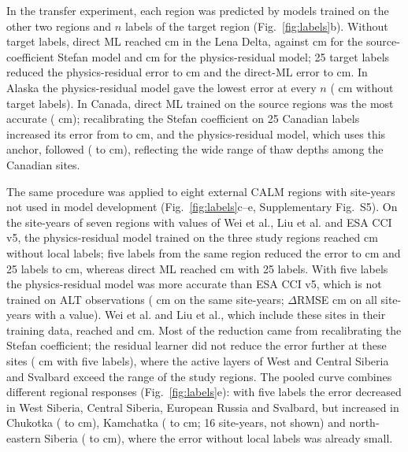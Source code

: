In the transfer experiment, each region was predicted by models trained on the other two regions and $n$ labels of the target region (Fig.~\ref{fig:labels}b). Without target labels, direct ML reached \ntlrmseLeDszero{} cm in the Lena Delta, against \ntlrmseLePzzero{} cm for the source-coefficient Stefan model and \ntlrmseLeRszero{} cm for the physics-residual model; 25 target labels reduced the physics-residual error to \ntlrmseLeRstwfive{} cm and the direct-ML error to \ntlrmseLeDstwfive{} cm. In Alaska the physics-residual model gave the lowest error at every $n$ (\ntlrmseAkRszero{} cm without target labels). In Canada, direct ML trained on the source regions was the most accurate (\ntlrmseCaDszero{} cm); recalibrating the Stefan coefficient on 25 Canadian labels increased its error from \ntlrmseCaPzzero{} to \ntlrmseCaPntwfive{} cm, and the physics-residual model, which uses this anchor, followed (\ntlrmseCaRszero{} to \ntlrmseCaRstwfive{} cm), reflecting the wide range of thaw depths among the Canadian sites.

The same procedure was applied to eight external CALM regions with \nftScoredRows{} site-years not used in model development (Fig.~\ref{fig:labels}c--e, Supplementary Fig.~S5). On the \nftrows{} site-years of seven regions with values of Wei et al., Liu et al. and ESA CCI v5, the physics-residual model trained on the three study regions reached \nftAllRszero{} cm without local labels; five labels from the same region reduced the error to \nftAllRsfive{} cm and 25 labels to \nftAllRstwfive{} cm, whereas direct ML reached \nftAllDstwfive{} cm with 25 labels. With five labels the physics-residual model was more accurate than ESA CCI v5, which is not trained on ALT observations (\nftAllCcifivezero{} cm on the same site-years; $\Delta$RMSE \nftdRsCcifivefive{} cm on all \nftdCciRows{} site-years with a value). Wei et al. and Liu et al., which include these sites in their training data, reached \nftAllWeizero{} and \nftAllLiuzero{} cm. Most of the reduction came from recalibrating the Stefan coefficient; the residual learner did not reduce the error further at these sites (\nftdRsPnfive{} cm with five labels), where the active layers of West and Central Siberia and Svalbard exceed the range of the study regions. The pooled curve combines different regional responses (Fig.~\ref{fig:labels}e): with five labels the error decreased in West Siberia, Central Siberia, European Russia and Svalbard, but increased in Chukotka (\nftChRszero{} to \nftChRsfive{} cm), Kamchatka (\nftKaRszero{} to \nftKaRsfive{} cm; 16 site-years, not shown) and north-eastern Siberia (\nftNsRszero{} to \nftNsRsfive{} cm), where the error without local labels was already small.

